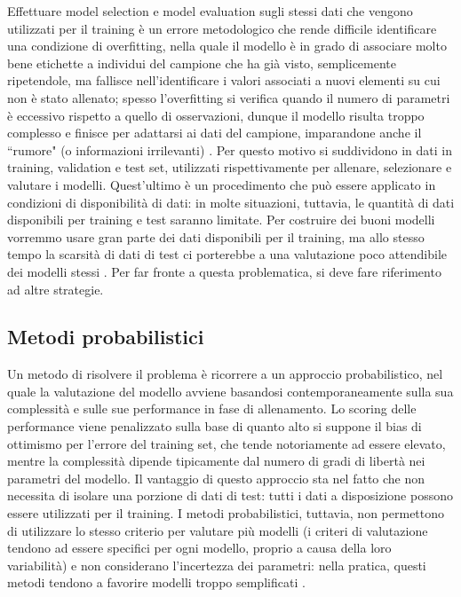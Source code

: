 \documentclass[12pt,a4paper]{report}
\begin{document}
Effettuare model selection e model evaluation sugli stessi dati che vengono utilizzati per il training  è un errore metodologico \cite{scikit-learn} che rende difficile identificare una condizione di overfitting, nella quale il modello è in grado di associare molto bene etichette a individui del campione che ha già visto, semplicemente ripetendole, ma fallisce nell'identificare i valori associati a nuovi elementi su cui non è stato allenato; spesso l'overfitting si verifica quando il numero di parametri è eccessivo rispetto a quello di osservazioni, dunque il modello risulta troppo complesso e finisce per adattarsi ai dati del campione, imparandone anche il ``rumore" (o informazioni irrilevanti) \cite{IBMlearning}.
Per questo motivo si suddividono in dati in training, validation e test set, utilizzati rispettivamente per allenare, selezionare e valutare i modelli.
Quest'ultimo è un procedimento che può essere applicato in condizioni di disponibilità di dati: in molte situazioni, tuttavia, le quantità di dati disponibili per training e test saranno limitate. Per costruire dei buoni modelli vorremmo usare gran parte dei dati disponibili per il training, ma allo stesso tempo la scarsità di dati di test ci porterebbe a una valutazione poco attendibile dei modelli stessi \cite{patternRecognitionML}.	
Per far fronte a questa problematica, si deve fare riferimento ad altre strategie.

\subsection{Metodi probabilistici}

Un metodo di risolvere il problema è ricorrere a un approccio probabilistico, nel quale la valutazione del modello avviene basandosi contemporaneamente sulla sua complessità e sulle sue performance in fase di allenamento.
Lo scoring delle performance viene penalizzato sulla base di quanto alto si suppone il bias di ottimismo per l'errore del training set, che tende notoriamente ad essere elevato, mentre la complessità dipende tipicamente dal numero di gradi di libertà nei parametri del modello.
Il vantaggio di questo approccio sta nel fatto che non necessita di isolare una porzione di dati di test: tutti i dati a disposizione possono essere utilizzati per il training. I metodi probabilistici, tuttavia, non permettono di utilizzare lo stesso criterio per valutare più modelli (i criteri di valutazione tendono ad essere specifici per ogni modello, proprio a causa della loro variabilità) e non considerano l'incertezza dei parametri: nella pratica, questi metodi tendono a favorire modelli troppo semplificati \cite{APM}.
\end{document}
